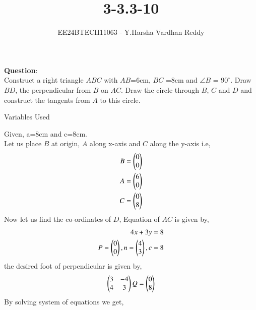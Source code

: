 \documentclass[journal]{IEEEtran}
\begin{document}

\vspace{3cm}

\title{3-3.3-10}
\author{EE24BTECH11063 - Y.Harsha Vardhan Reddy
}
{\let\newpage\relax\maketitle}

\renewcommand{\thefigure}{\theenumi}
\renewcommand{\thetable}{\theenumi}
\setlength{\intextsep}{10pt} %


\renewcommand{\thetable}{\theenumi}
\textbf{Question}:\\
Construct a right triangle $ABC$ with $AB$=6cm, $BC$ =8cm and $\angle{B}$ = $90^{\circ}$. Draw $BD$, the perpendicular from $B$ on $AC$. Draw the circle through $B$, $C$ and $D$ and construct the tangents from $A$ to this circle.
\\
\solution
\begin{table}[h!]    
  \centering
  
  \caption{Variables Used}
  \label{tab1-1.2-20}
\end{table}
Given, a=8cm and c=8cm.\\
Let us place $B$ at origin, $A$ along x-axis and $C$ along the y-axis i.e, 
\begin{align}
B = \begin{pmatrix}0\\0\end{pmatrix} \\
A = \begin{pmatrix}6\\0\end{pmatrix} \\
C = \begin{pmatrix}0\\8\end{pmatrix}
\end{align}
Now let us find the co-ordinates of $D$,
Equation of $AC$ is given by,
\begin{align}
4x+3y=8\\
    P=\begin{pmatrix}0\\0\end{pmatrix},n=\begin{pmatrix}4\\3\end{pmatrix},c=8\\
\end{align}
the desired foot of perpendicular is given by,
\begin{align}
    \begin{pmatrix}3&-4\\4&3\end{pmatrix}Q=\begin{pmatrix}0\\8\end{pmatrix}
\end{align}
By solving system of equations we get,
\end{document}
